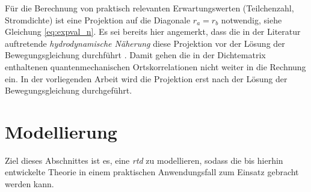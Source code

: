 Für die Berechnung von praktisch relevanten Erwartungswerten (Teilchenzahl, Stromdichte) ist eine Projektion auf die Diagonale $r_a=r_b$ notwendig, siehe Gleichung \eqref{eq:expval_n}. Es sei bereits hier angemerkt, dass die in der Literatur auftretende  \emph{hydrodynamische Näherung} diese Projektion vor der Lösung der Bewegungsgleichung durchführt \cite{wiedenhaus}. Damit gehen die in der Dichtematrix enthaltenen quantenmechanischen Ortskorrelationen nicht weiter in die Rechnung ein. In der vorliegenden Arbeit wird die Projektion erst nach der Lösung der Bewegungsgleichung durchgeführt.


\section{Modellierung}
\label{sec:modellierung}
Ziel dieses Abschnittes ist es, eine \emph{\ac{rtd}}  zu modellieren, sodass die bis hierhin entwickelte Theorie in einem praktischen Anwendungsfall zum Einsatz gebracht werden kann.

